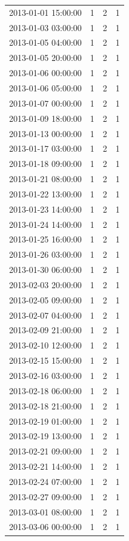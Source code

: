 \begin{tabular}{lrrr}
2013-01-01 15:00:00 & 1 & 2 & 1 \\
2013-01-03 03:00:00 & 1 & 2 & 1 \\
2013-01-05 04:00:00 & 1 & 2 & 1 \\
2013-01-05 20:00:00 & 1 & 2 & 1 \\
2013-01-06 00:00:00 & 1 & 2 & 1 \\
2013-01-06 05:00:00 & 1 & 2 & 1 \\
2013-01-07 00:00:00 & 1 & 2 & 1 \\
2013-01-09 18:00:00 & 1 & 2 & 1 \\
2013-01-13 00:00:00 & 1 & 2 & 1 \\
2013-01-17 03:00:00 & 1 & 2 & 1 \\
2013-01-18 09:00:00 & 1 & 2 & 1 \\
2013-01-21 08:00:00 & 1 & 2 & 1 \\
2013-01-22 13:00:00 & 1 & 2 & 1 \\
2013-01-23 14:00:00 & 1 & 2 & 1 \\
2013-01-24 14:00:00 & 1 & 2 & 1 \\
2013-01-25 16:00:00 & 1 & 2 & 1 \\
2013-01-26 03:00:00 & 1 & 2 & 1 \\
2013-01-30 06:00:00 & 1 & 2 & 1 \\
2013-02-03 20:00:00 & 1 & 2 & 1 \\
2013-02-05 09:00:00 & 1 & 2 & 1 \\
2013-02-07 04:00:00 & 1 & 2 & 1 \\
2013-02-09 21:00:00 & 1 & 2 & 1 \\
2013-02-10 12:00:00 & 1 & 2 & 1 \\
2013-02-15 15:00:00 & 1 & 2 & 1 \\
2013-02-16 03:00:00 & 1 & 2 & 1 \\
2013-02-18 06:00:00 & 1 & 2 & 1 \\
2013-02-18 21:00:00 & 1 & 2 & 1 \\
2013-02-19 01:00:00 & 1 & 2 & 1 \\
2013-02-19 13:00:00 & 1 & 2 & 1 \\
2013-02-21 09:00:00 & 1 & 2 & 1 \\
2013-02-21 14:00:00 & 1 & 2 & 1 \\
2013-02-24 07:00:00 & 1 & 2 & 1 \\
2013-02-27 09:00:00 & 1 & 2 & 1 \\
2013-03-01 08:00:00 & 1 & 2 & 1 \\
2013-03-06 00:00:00 & 1 & 2 & 1 \\

\end{tabular}
